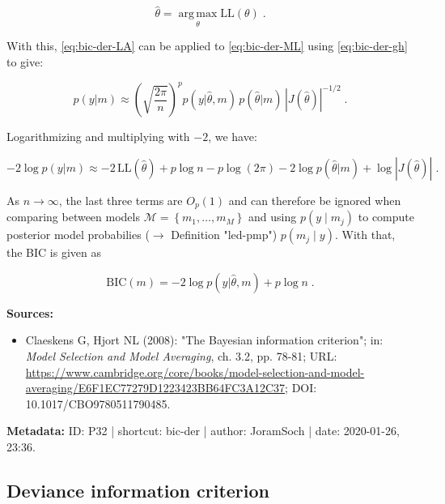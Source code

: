 \documentclass[a4paper,12pt]{book}
\begin{document}
\begin{equation} \label{eq:bic-der-MLE}
\hat{\theta} = \operatorname*{arg\,max}_\theta \mathrm{LL}(\theta) \; .
\end{equation}

With this, \eqref{eq:bic-der-LA} can be applied to \eqref{eq:bic-der-ML} using \eqref{eq:bic-der-gh} to give:

\begin{equation} \label{eq:bic-der-ML-approx}
p(y|m) \approx \left( \sqrt{\frac{2 \pi}{n}} \right)^p p(y|\hat{\theta},m) \, p(\hat{\theta}|m) \, \left| J(\hat{\theta}) \right|^{-1/2} \; .
\end{equation}

Logarithmizing and multiplying with $-2$, we have:

\begin{equation} \label{eq:bic-der-LME-approx}
-2 \log p(y|m) \approx -2 \, \mathrm{LL}(\hat{\theta}) + p \log n - p \log(2 \pi) - 2 \log p(\hat{\theta}|m) + \log \left| J(\hat{\theta}) \right| \; .
\end{equation}

As $n \to \infty$, the last three terms are $O_p(1)$ and can therefore be ignored when comparing between models $\mathcal{M} = \left\lbrace m_1, \ldots, m_M \right\rbrace$ and using $p(y \mid m_j)$ to compute posterior model probabilies ($\rightarrow$ Definition "led-pmp") $p(m_j \mid y)$. With that, the BIC is given as

\begin{equation} \label{eq:bic-der-BIC-qed}
\mathrm{BIC}(m) = -2 \log p(y|\hat{\theta}, m) + p \log n \; .
\end{equation}

\vspace{1em}
\textbf{Sources:}
\begin{itemize}
\item Claeskens G, Hjort NL (2008): "The Bayesian information criterion"; in: \textit{Model Selection and Model Averaging}, ch. 3.2, pp. 78-81; URL: \url{https://www.cambridge.org/core/books/model-selection-and-model-averaging/E6F1EC77279D1223423BB64FC3A12C37}; DOI: 10.1017/CBO9780511790485.
\end{itemize}


\vspace{1em}
\textbf{Metadata:} ID: P32 | shortcut: bic-der | author: JoramSoch | date: 2020-01-26, 23:36.


\subsection{Deviance information criterion}
\end{document}
